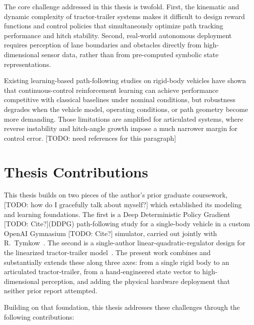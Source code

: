 The core challenge addressed in this thesis is twofold. First, the kinematic and dynamic complexity of tractor-trailer systems makes it difficult to design reward functions and control policies that simultaneously optimize path tracking performance and hitch stability. Second, real-world autonomous deployment requires perception of lane boundaries and obstacles directly from high-dimensional sensor data, rather than from pre-computed symbolic state representations.

Existing learning-based path-following studies on rigid-body vehicles have shown that continuous-control reinforcement learning can achieve performance competitive with classical baselines under nominal conditions, but robustness degrades when the vehicle model, operating conditions, or path geometry become more demanding. Those limitations are amplified for articulated systems, where reverse instability and hitch-angle growth impose a much narrower margin for control error. [TODO: need references for this paragraph]

\section{Thesis Contributions}

This thesis builds on two pieces of the author's prior graduate coursework, [TODO: how do I gracefully talk about myself?] which established its modeling and learning foundations. The first is a Deep Deterministic Policy Gradient [TODO: Cite?](DDPG) path-following study for a single-body vehicle in a custom OpenAI Gymnasium [TODO: Cite?] simulator, carried out jointly with R.\ Tymkow~\cite{tymkow2024me780}. The second is a single-author linear-quadratic-regulator design for the linearized tractor-trailer model~\cite{schnapp2024ece682}. The present work combines and substantially extends these along three axes: from a single rigid body to an articulated tractor-trailer, from a hand-engineered state vector to high-dimensional perception, and adding the physical hardware deployment that neither prior report attempted.

Building on that foundation, this thesis addresses these challenges through the following contributions:

